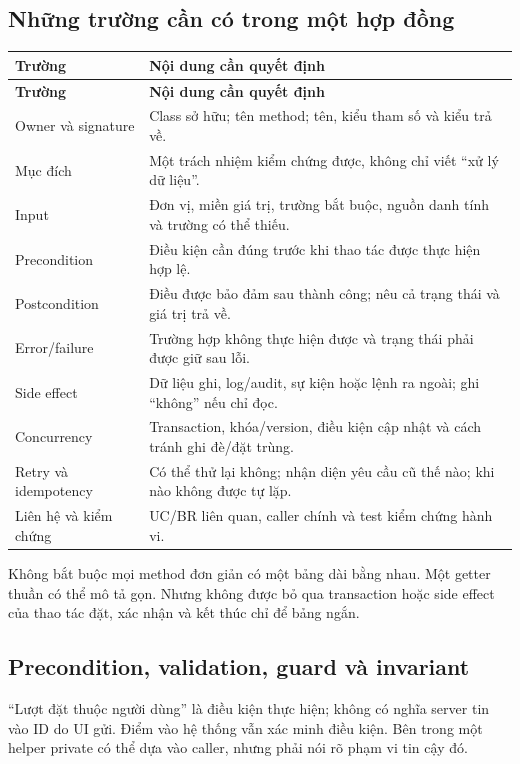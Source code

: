 \subsection{Những trường cần có trong một hợp đồng}
\begin{longtable}{|L{33mm}|L{109mm}|}\hline
\textbf{Trường} & \textbf{Nội dung cần quyết định}\\\hline
\endfirsthead
\hline
\textbf{Trường} & \textbf{Nội dung cần quyết định}\\\hline
\endhead
Owner và signature & Class sở hữu; tên method; tên, kiểu tham số và kiểu trả về.\\\hline
Mục đích & Một trách nhiệm kiểm chứng được, không chỉ viết ``xử lý dữ liệu''.\\\hline
Input & Đơn vị, miền giá trị, trường bắt buộc, nguồn danh tính và trường có thể thiếu.\\\hline
Precondition & Điều kiện cần đúng trước khi thao tác được thực hiện hợp lệ.\\\hline
Postcondition & Điều được bảo đảm sau thành công; nêu cả trạng thái và giá trị trả về.\\\hline
Error/failure & Trường hợp không thực hiện được và trạng thái phải được giữ sau lỗi.\\\hline
Side effect & Dữ liệu ghi, log/audit, sự kiện hoặc lệnh ra ngoài; ghi ``không'' nếu chỉ đọc.\\\hline
Concurrency & Transaction, khóa/version, điều kiện cập nhật và cách tránh ghi đè/đặt trùng.\\\hline
Retry và idempotency & Có thể thử lại không; nhận diện yêu cầu cũ thế nào; khi nào không được tự lặp.\\\hline
Liên hệ và kiểm chứng & UC/BR liên quan, caller chính và test kiểm chứng hành vi.\\\hline
\end{longtable}

Không bắt buộc mọi method đơn giản có một bảng dài bằng nhau. Một getter thuần có thể mô tả gọn. Nhưng không được bỏ qua transaction hoặc side effect của thao tác đặt, xác nhận và kết thúc chỉ để bảng ngắn.

\subsection{Precondition, validation, guard và invariant}
``Lượt đặt thuộc người dùng'' là điều kiện thực hiện; không có nghĩa server tin vào ID do UI gửi. Điểm vào hệ thống vẫn xác minh điều kiện. Bên trong một helper private có thể dựa vào caller, nhưng phải nói rõ phạm vi tin cậy đó.

